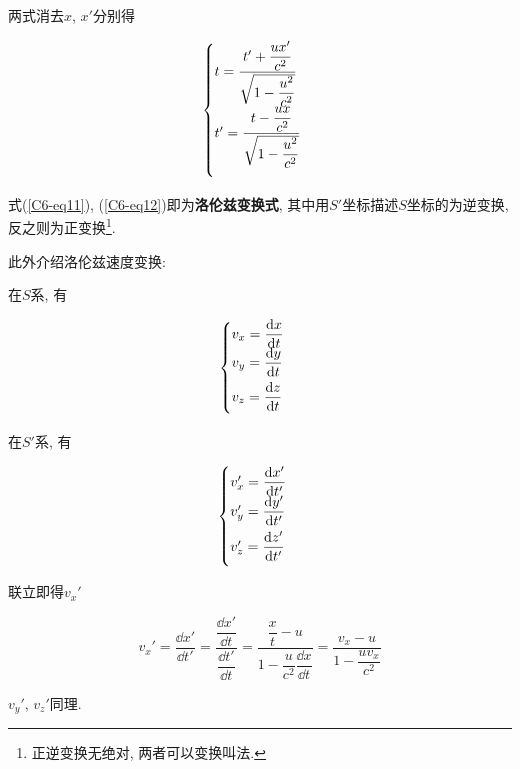 两式消去$x$, $x'$分别得

\begin{equation}
	\begin{cases}
		t = \dfrac{t' + \dfrac{u x'}{c^2}}{\sqrt{1 - \dfrac{u^2}{c^2}}} \\ \vspace{2.0ex}
		t' = \dfrac{t - \dfrac{u x}{c^2}}{\sqrt{1 - \dfrac{u^2}{c^2}}}
	\end{cases}
    \label{C6-eq12}
\end{equation}

式(\ref{C6-eq11}), (\ref{C6-eq12})即为\textbf{洛伦兹变换式}, 其中用$S'$坐标描述$S$坐标的为逆变换, 反之则为正变换\footnote{正逆变换无绝对, 两者可以变换叫法. }. 

此外介绍洛伦兹速度变换: 

在$S$系, 有

\begin{equation}
	\begin{cases}
		v_x = \dfrac{\dd{x}}{\dd{t}} \\ 
		\vspace{1ex}
		v_y = \dfrac{\dd{y}}{\dd{t}} \\ \vspace{1ex}
		v_z = \dfrac{\dd{z}}{\dd{t}} 
	\end{cases}
    \label{C6-eq13}
\end{equation}

在$S'$系, 有

\begin{equation}
	\begin{cases}
		v_x' = \dfrac{\dd{x'}}{\dd{t'}} \\ 
		\vspace{1ex}
		v_y' = \dfrac{\dd{y'}}{\dd{t'}} \\ \vspace{1ex}
		v_z' = \dfrac{\dd{z'}}{\dd{t'}} 
	\end{cases}
	\label{C6-eq14}
\end{equation}

联立即得$v_x'$

\begin{equation}
	v_x' = \dfrac{\dd{x'}}{\dd{t'}} = \dfrac{\dfrac{\dd{x'}}{\dd{t}}}{\dfrac{\dd{t'}}{\dd{t}}} = \dfrac{\dfrac{x}{t} - u}{1 - \dfrac{u}{c^2} \dfrac{\dd{x}}{\dd{t}}} = \dfrac{v_x - u}{1 - \dfrac{u v_x}{c^2}} \label{C6-eq15}
\end{equation}

$v_y'$, $v_z'$同理. 

\newpage

